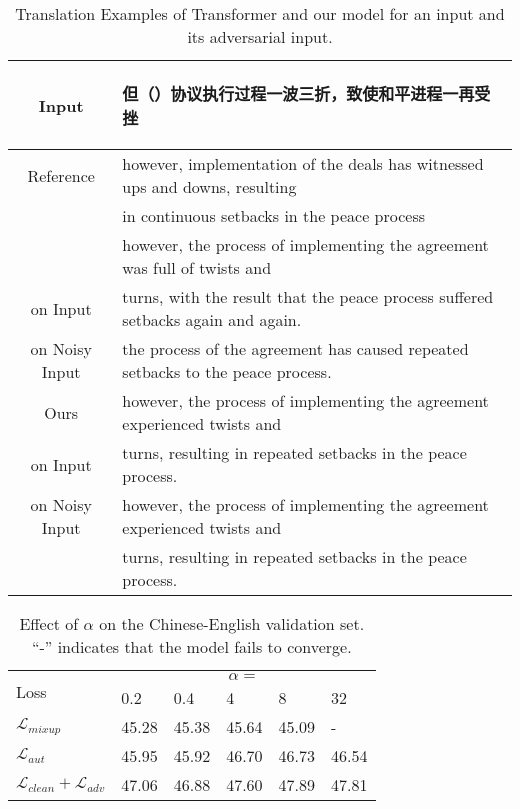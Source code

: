 \documentclass[11pt,a4paper]{article}
\begin{document}
\begin{table*}[!t]
\centering
\begin{tabular}{c|l}
\hline
  Input & \begin{CJK*}{UTF8}{gbsn}{但（{\color{red}{但是}}）协议执行过程一波三折，致使和平进程一再受挫}\end{CJK*}\\
 \hline
 Reference & however, implementation of the deals has witnessed ups and downs, resulting \\ & in continuous setbacks in the peace process \\
\hline \hline
\citeauthor{Vaswani:17} & however, the process of implementing the agreement was full of twists and \\ 
on Input  &turns, with the result that the peace process suffered setbacks again and again.\\
\hline

on Noisy Input & the process of the agreement has caused repeated setbacks to the peace process.       \\
\hline \hline
Ours & however, the process of implementing the agreement experienced twists and \\
on Input &turns, resulting in repeated setbacks in the peace process.\\
\hline
on Noisy Input & however, the process of implementing the agreement experienced twists and\\
    &turns, resulting in repeated setbacks in the peace process. \\
\hline
\end{tabular}
\caption{Translation Examples of Transformer and our model for an input and its adversarial input.}
\label{table:robust_examples} 
\end{table*}



\begin{table}[!t]
\centering
\setlength\tabcolsep{3.9pt}
\begin{tabular}{l|l|l|l|l|l}
\hline
\multirow{2}{*}{Loss} &\multicolumn{5}{c}{$\alpha = $} \\
\cline{2-6}
&0.2 &0.4 &4 &8 & 32 \\

\hline \hline
$\mathcal{L}_{mixup}$ &45.28 &45.38 &45.64 &45.09 & -\\
{$\mathcal{L}_{aut}$} &45.95 &45.92 &46.70 &46.73 &46.54\\
{\!\tiny $\mathcal{L}_{clean}\!\! +\!\! \mathcal{L}_{adv}$\!} &47.06 &46.88  &47.60  &47.89 &47.81 \\
\hline
\end{tabular}
\caption{Effect of $\alpha$ on the Chinese-English validation set. ``-'' indicates that the model fails to converge.}
\label{table:alpha} 
\end{table}
\end{document}
